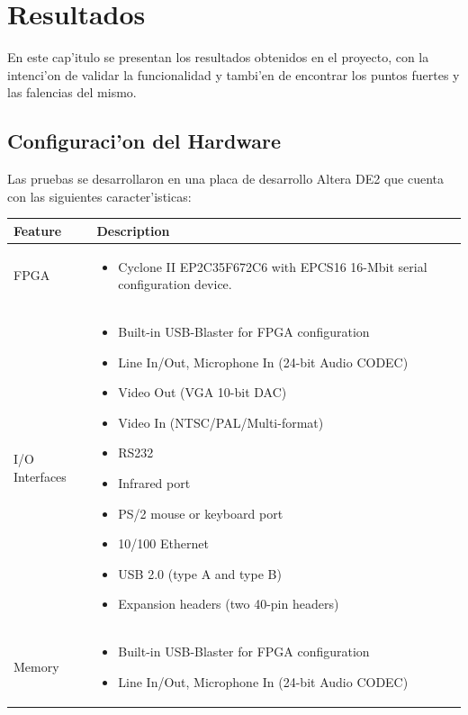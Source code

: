 \documentclass[12pt,spanish]{article}
\begin{document}
\section{Resultados}
En este cap'itulo se presentan los resultados obtenidos en el proyecto, con la intenci'on de validar la funcionalidad y tambi'en de encontrar los puntos fuertes y las falencias del mismo.

\subsection{Configuraci'on del Hardware}
Las pruebas se desarrollaron en una placa de desarrollo Altera DE2 que cuenta con las siguientes caracter'isticas:


\begin{center}
	\begin{longtable}{|l|p{4.75in}|} \hline
		\textbf{Feature} & \textbf{Description} \\ \hline
		FPGA & \begin{itemize}
			\item Cyclone II EP2C35F672C6 with EPCS16 16-Mbit serial configuration device.
			\end{itemize} \\ \hline
		I/O Interfaces &     \begin{itemize}
					\item Built-in USB-Blaster for FPGA configuration
    					\item Line In/Out, Microphone In (24-bit Audio CODEC)
   					\item Video Out (VGA 10-bit DAC)
   					\item Video In (NTSC/PAL/Multi-format)
   					\item RS232
    					\item Infrared port
   					\item PS/2 mouse or keyboard port
    					\item 10/100 Ethernet
   					\item USB 2.0 (type A and type B)
    					\item Expansion headers (two 40-pin headers)
				     \end{itemize} \\ \hline
		Memory & \begin{itemize}
					\item Built-in USB-Blaster for FPGA configuration
    					\item Line In/Out, Microphone In (24-bit Audio CODEC)
    			 \end{itemize} \\ \hline

\end{longtable}
\end{center}
\end{document}
